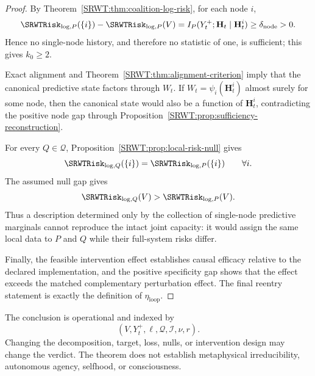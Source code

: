 \begin{proof}
By Theorem~\ref{SRWT:thm:coalition-log-risk}, for each node \(i\),
\[
\SRWTRisk_{\log,P}(\{i\})-
\SRWTRisk_{\log,P}(V)
=
I_P(Y_t^+;\mathbf H_t\mid\mathbf H_t^i)
\geq
\delta_{\mathrm{node}}>0.
\]
Hence no single-node history, and therefore no statistic of one, is sufficient;
this gives \(k_0\geq2\).

Exact alignment and Theorem~\ref{SRWT:thm:alignment-criterion} imply that the
canonical predictive state factors through \(W_t\). If
\(W_t=\psi_i(\mathbf H_t^i)\) almost surely for some node, then the canonical
state would also be a function of \(\mathbf H_t^i\), contradicting the positive
node gap through Proposition~\ref{SRWT:prop:sufficiency-reconstruction}.

For every \(Q\in\mathcal Q\), Proposition~\ref{SRWT:prop:local-risk-null} gives
\[
\SRWTRisk_{\log,Q}(\{i\})
=
\SRWTRisk_{\log,P}(\{i\})
\qquad\forall i.
\]
The assumed null gap gives
\[
\SRWTRisk_{\log,Q}(V)
>
\SRWTRisk_{\log,P}(V).
\]
Thus a description determined only by the collection of single-node predictive
marginals cannot reproduce the intact joint capacity: it would assign the same
local data to \(P\) and \(Q\) while their full-system risks differ.

Finally, the feasible intervention effect establishes causal efficacy relative
to the declared implementation, and the positive specificity gap shows that
the effect exceeds the matched complementary perturbation effect. The final
reentry statement is exactly the definition of \(\eta_{\mathrm{loop}}\).
\end{proof}

\begin{SRWTremark}
The conclusion is operational and indexed by
\[
(V,Y_t^+,\ell,\mathcal Q,\mathcal I,\nu,r).
\]
Changing the decomposition, target, loss, nulls, or intervention design may
change the verdict. The theorem does not establish metaphysical
irreducibility, autonomous agency, selfhood, or consciousness.
\end{SRWTremark}



